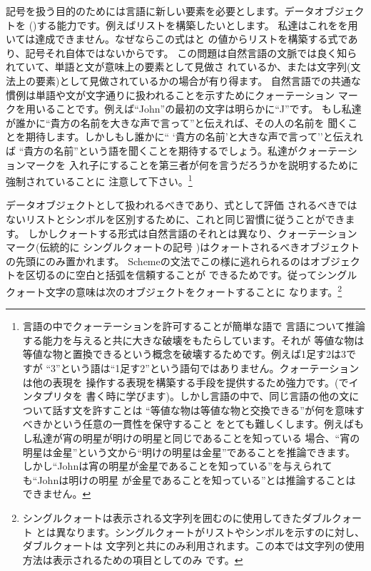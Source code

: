 \noindent
記号を扱う目的のためには言語に新しい要素を必要とします。データオブジェクトを
()する能力です。例えばリストを構築したいとします。
私達はこれをを用いては達成できません。なぜならこの式はと
の値からリストを構築する式であり、記号それ自体ではないからです。
この問題は自然言語の文脈では良く知られていて、単語と文が意味上の要素として見做さ
れているか、または文字列(文法上の要素)として見做されているかの場合が有り得ます。
自然言語での共通な慣例は単語や文が文字通りに扱われることを示すためにクォーテーション
マークを用いることです。例えば``John''の最初の文字は明らかに``J''です。
もし私達が誰かに``貴方の名前を大きな声で言って''と伝えれば、その人の名前を
聞くことを期待します。しかしもし誰かに`` `貴方の名前'と大きな声で言って''と伝えれば
``貴方の名前''という語を聞くことを期待するでしょう。私達がクォーテーションマークを
入れ子にすることを第三者が何を言うだろうかを説明するために強制されていることに
注意して下さい。\footnote{言語の中でクォーテーションを許可することが簡単な語で
言語について推論する能力を与えると共に大きな破壊をもたらしています。それが
等値な物は等値な物と置換できるという概念を破壊するためです。例えば1足す2は3ですが
``3''という語は``1足す2''という語句ではありません。クォーテーションは他の表現を
操作する表現を構築する手段を提供するため強力です。(でインタプリタを
書く時に学びます)。しかし言語の中で、同じ言語の他の文について話す文を許すことは
``等値な物は等値な物と交換できる''が何を意味すべきかという任意の一貫性を保守すること
をとても難しくします。例えばもし私達が宵の明星が明けの明星と同じであることを知っている
場合、``宵の明星は金星''という文から``明けの明星は金星''であることを推論できます。
しかし``Johnは宵の明星が金星であることを知っている''を与えられても``Johnは明けの明星
が金星であることを知っている''とは推論することはできません。}



データオブジェクトとして扱われるべきであり、式として評価
されるべきではないリストとシンボルを区別するために、これと同じ習慣に従うことができます。
しかしクォートする形式は自然言語のそれとは異なり、クォーテーションマーク(伝統的に
シングルクォートの記号 )はクォートされるべきオブジェクトの先頭にのみ置かれます。
Schemeの文法でこの様に逃れられるのはオブジェクトを区切るのに空白と括弧を信頼することが
できるためです。従ってシングルクォート文字の意味は次のオブジェクトをクォートすることに
なります。\footnote{シングルクォートは表示される文字列を囲むのに使用してきたダブルクォート
とは異なります。シングルクォートがリストやシンボルを示すのに対し、ダブルクォートは
文字列と共にのみ利用されます。この本では文字列の使用方法は表示されるための項目としてのみ
です。}


